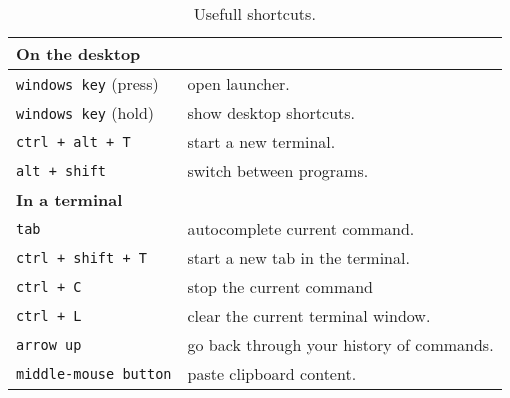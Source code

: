 \documentclass[11pt,a4paper]{article}
\begin{document}
\begin{table}[!ht]
	\centering
	\begin{tabular}{p{5cm}p{10cm}}
		\toprule[1pt]
		\textbf{On the desktop} & \\
		\midrule
		\texttt{windows key} (press) & open launcher.\\
		\texttt{windows key} (hold) & show desktop shortcuts.\\
		\texttt{ctrl + alt + T } & start a new terminal.\\
		\texttt{alt + shift} & switch between programs.\\
		\midrule
		\textbf{In a terminal} & \\
		\midrule
		\texttt{tab} & autocomplete current command.\\
		\texttt{ctrl + shift + T} & start a new tab in the terminal.\\
		\texttt{ctrl + C} & stop the current command\\
		\texttt{ctrl + L} & clear the current terminal window.\\
		\texttt{arrow up} & go back through your history of commands.\\
		\texttt{middle-mouse button} & paste clipboard content.\\
		\bottomrule[1pt]
	\end{tabular}
	\caption{Usefull shortcuts.}
\end{table}
\end{document}
